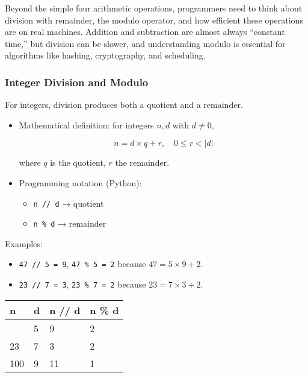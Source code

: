 \documentclass[
  letterpaper,
  DIV=11,
  numbers=noendperiod]{scrreprt}
\providecommand{\tightlist}{%
  \setlength{\itemsep}{0pt}\setlength{\parskip}{0pt}}
\begin{document}
Beyond the simple four arithmetic operations, programmers need to think
about division with remainder, the modulo operator, and how efficient
these operations are on real machines. Addition and subtraction are
almost always ``constant time,'' but division can be slower, and
understanding modulo is essential for algorithms like hashing,
cryptography, and scheduling.

\subsubsection{Integer Division and
Modulo}\label{integer-division-and-modulo}

For integers, division produces both a quotient and a remainder.

\begin{itemize}
\item
  Mathematical definition: for integers \(n, d\) with \(d \neq 0\),

  \[
  n = d \times q + r, \quad 0 \leq r < |d|
  \]

  where \(q\) is the quotient, \(r\) the remainder.
\item
  Programming notation (Python):

  \begin{itemize}
  \tightlist
  \item
    \texttt{n\ //\ d} → quotient
  \item
    \texttt{n\ \%\ d} → remainder
  \end{itemize}
\end{itemize}

Examples:

\begin{itemize}
\tightlist
\item
  \texttt{47\ //\ 5\ =\ 9}, \texttt{47\ \%\ 5\ =\ 2} because
  \(47 = 5 \times 9 + 2\).
\item
  \texttt{23\ //\ 7\ =\ 3}, \texttt{23\ \%\ 7\ =\ 2} because
  \(23 = 7 \times 3 + 2\).
\end{itemize}

\begin{longtable}[]{@{}llll@{}}
\toprule\noalign{}
n & d & n // d & n \% d \\
\midrule\noalign{}
\endhead
\bottomrule\noalign{}
\endlastfoot
47 & 5 & 9 & 2 \\
23 & 7 & 3 & 2 \\
100 & 9 & 11 & 1 \\
\end{longtable}
\end{document}
